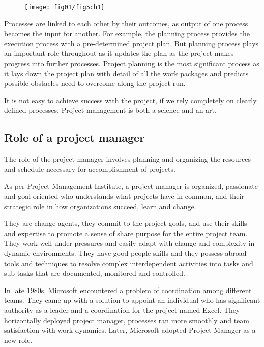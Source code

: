  \begin{figure}
 	\centering
 	\texttt{[image: fig01/fig5ch1]}
 \end{figure}
 Processes are linked to each other by their outcomes, as output of one process becomes the input for another. For example, the planning process provides the execution process with a pre-determined project plan. But planning process plays an important role throughout as it updates the plan as the project makes progress into further processes. Project planning is the most significant process as it lays down the project plan with detail of all the work packages and predicts possible obstacles need to overcome along the project run.

It is not easy to achieve success with the project, if we rely completely on clearly defined processes. Project management is both a science and an art.

\subsection{Role of a project manager}
\label{subsec:subsec02}

The role of the project manager involves planning and organizing the resources and schedule necessary for accomplishment of projects.

As per Project Management Institute, a project manager is organized, passionate and goal-oriented who understands what projects have in common, and their strategic role in how organizations succeed, learn and change.

They are change agents, they commit to the project goals, and use their skills and expertise to promote a sense of share purpose for the entire project team.
They work well under pressures and easily adapt with change and complexity in dynamic environments. They have good people skills and they possess abroad tools and techniques to resolve complex interdependent activities into tasks and sub-tasks that are documented, monitored and controlled.

In late 1980s, Microsoft encountered a problem of coordination among different teams. They came up with a solution to appoint an individual who has significant authority as a leader and a coordination for the project named Excel. They horizontally deployed project manager, processes ran more smoothly and team satisfaction with work dynamics. Later, Microsoft adopted Project Manager as a new role.

